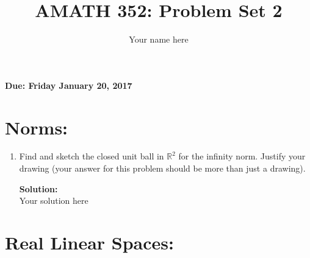 \documentclass[]{article}
\title{AMATH 352: Problem Set 2}
\author{Your name here}
\newcommand{\R}{\mathbb{R}}
\newcommand{\solution}{\vskip 0.5cm \textbf{\large Solution:} \\}
\begin{document}
\maketitle
{\Large \textbf{Due: Friday January 20, 2017}}
\\

\section*{Norms:}
\begin{enumerate}
	\item Find and sketch the closed unit ball in $\R^2$ for the infinity norm. Justify your drawing (your answer for this problem should be more than just a drawing).

	  \solution
      
	Your solution here
\end{enumerate}

\section*{Real Linear Spaces:}
\end{document}
